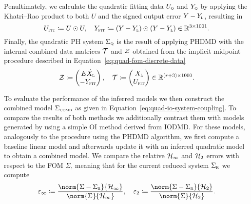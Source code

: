 Penultimately, we calculate the quadratic fitting data $U_{\textnormal{\scshape q}}$ and $Y_{\textnormal{\scshape q}}$ by applying the Khatri--Rao product to both $U$ and the signed output error $Y - Y_{\textnormal{\scshape l}}$, resulting in
\begin{equation*}
    U_{\textnormal{\scshape fit}} \coloneqq U \odot U,\quad Y_{\textnormal{\scshape fit}} \coloneqq (Y - Y_{\textnormal{\scshape l}}) \odot (Y - Y_{\textnormal{\scshape l}}) \in \mathbb{R}^{3 \times 1001}.
\end{equation*}
Finally, the quadratic \ac{PH} system $\Sigma_{\textnormal{\scshape q}}$ is the result of applying \ac{PHDMD} with the internal combined data matrices $\mathcal{T}$ and $\mathcal{Z}$ obtained from the implicit midpoint procedure described in Equation~\eqref{eq:quad-fom-discrete-data}
\begin{equation*}
    \mathcal{Z} \coloneqq \begin{pmatrix}
        E \dot{X_{\textnormal{\scshape l}}} \\
        -Y_{\textnormal{\scshape fit}}
    \end{pmatrix},\quad \mathcal{T} \coloneqq \begin{pmatrix}
        X_{\textnormal{\scshape l}} \\
        U_{\textnormal{\scshape fit}}
    \end{pmatrix} \in \mathbb{R}^{(r + 3) \times 1000}.
\end{equation*}

To evaluate the performance of the inferred models we then construct the combined model $\Sigma_{\textnormal{\scshape comb}}$ as given in Equation~\eqref{eq:quad-io-system-coupling}.
To compare the results of both methods we additionally contrast them with models generated by using a simple \ac{OI} method derived from \ac{IODMD}.
For these models, analogously to the procedure using the \ac{PHDMD} algorithm, we first compute a baseline linear model and afterwards update it with an inferred quadratic model to obtain a combined model.
We compare the relative $\mathcal{H}_\infty$ and $\mathcal{H}_2$ errors with respect to the \ac{FOM} $\Sigma$, meaning that for the current reduced system $\Sigma_{\textnormal{\scshape r}}$ we compute
\begin{equation}\label{eq:rel-errors}
    \varepsilon_\infty \coloneqq \frac{\norm{\Sigma - \Sigma_\msc{r}}{\mcl{H}_\infty}}{\norm{\Sigma}{\mcl{H}_\infty}},\quad \varepsilon_2 \coloneqq \frac{\norm{\Sigma - \Sigma_\msc{r}}{\mcl{H}_2}}{\norm{\Sigma}{\mcl{H}_2}}.
\end{equation}

